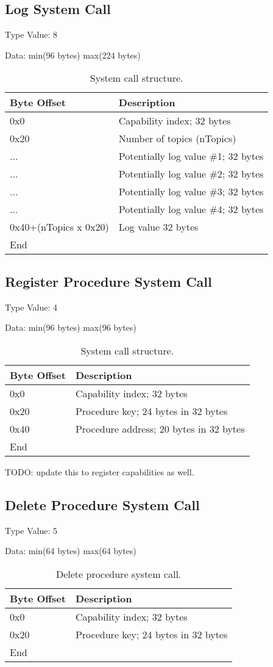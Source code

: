 \documentclass[english,a4paper]{article}
\begin{document}
\subsection{Log System Call}
Type Value: 8

Data: min(96 bytes) max(224 bytes)

\begin{table}[H]
  \caption{System call structure.}
  \centering{}%
  \begin{tabular}{l|p{}}
    \hline
    Byte Offset & Description\tabularnewline
    \hline
    \hline
    0x0 & Capability index; 32 bytes \tabularnewline
    0x20 & Number of topics (nTopics) \tabularnewline
    ... & Potentially log value \#1; 32 bytes \tabularnewline
    ... & Potentially log value \#2; 32 bytes \tabularnewline
    ... & Potentially log value \#3; 32 bytes \tabularnewline
    ... & Potentially log value \#4; 32 bytes \tabularnewline
    0x40+(nTopics x 0x20) & Log value 32 bytes \tabularnewline
    \hline
    End &  \tabularnewline
    \hline
  \end{tabular}
\end{table}

\subsection{Register Procedure System Call}
Type Value: 4

Data: min(96 bytes) max(96 bytes)

\begin{table}[H]
  \caption{System call structure.}
  \centering{}%
  \begin{tabular}{l|p{}}
    \hline
    Byte Offset & Description\tabularnewline
    \hline
    \hline
    0x0 & Capability index; 32 bytes \tabularnewline
    0x20 & Procedure key; 24 bytes in 32 bytes \tabularnewline
    0x40 & Procedure address; 20 bytes in 32 bytes \tabularnewline
    \hline
    End &  \tabularnewline
    \hline
  \end{tabular}
\end{table}
TODO: update this to register capabilities as well.


\subsection{Delete Procedure System Call}
Type Value: 5

Data: min(64 bytes) max(64 bytes)

\begin{table}[H]
  \caption{Delete procedure system call.}
  \centering{}%
  \begin{tabular}{l|p{}}
    \hline
    Byte Offset & Description\tabularnewline
    \hline
    \hline
    0x0 & Capability index; 32 bytes \tabularnewline
    0x20 & Procedure key; 24 bytes in 32 bytes \tabularnewline
    \hline
    End &  \tabularnewline
    \hline
  \end{tabular}
\end{table}
\end{document}

